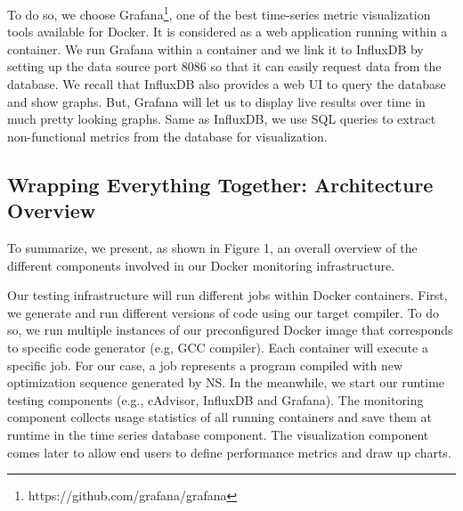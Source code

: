 To do so, we choose Grafana\footnote{https://github.com/grafana/grafana}, one of the best time-series metric visualization tools available for Docker. It is considered as a web application running within a container. We run Grafana within a container and we link it to InfluxDB by setting up the data source port 8086 so that it can easily request data from the database. 
We recall that InfluxDB also provides a web UI to query the database and show graphs. But, Grafana will let us to display live results over time in much pretty looking graphs. Same as InfluxDB, we use SQL queries to extract non-functional metrics from the database for visualization.

\subsection{Wrapping Everything Together: Architecture Overview}
To summarize, we present, as shown in Figure 1, an overall overview of the different components involved in our Docker monitoring infrastructure.




Our testing infrastructure will run different jobs within Docker containers. First, we generate and run different versions of code using our target compiler. To do so, we run multiple instances of our preconfigured Docker image that corresponds to specific code generator (e.g, GCC compiler). Each container will execute a specific job. For our case, a job represents a program compiled with new optimization sequence generated by NS. In the meanwhile, we start our runtime testing components (e.g., cAdvisor, InfluxDB and Grafana). The monitoring component collects usage statistics of all running containers and save them at runtime in the time series database component. The visualization component comes later to allow end users to define performance metrics and draw up charts.
